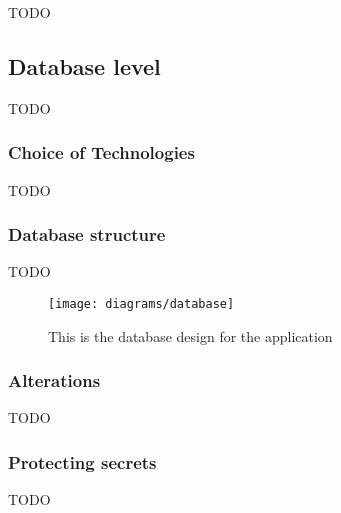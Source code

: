 {TODO}

\subsection{Database level}

{TODO}

\subsubsection*{Choice of Technologies}
\label{sec:database_choice_of_tech}

{TODO}

\subsubsection*{Database structure}

{TODO}

\begin{figure}[H]
    \centering
    \texttt{[image: diagrams/database]}
    \caption{This is the database design for the application}
    \label{fig:diagram_database_image}
\end{figure} 
\noindent

\subsubsection*{Alterations}

{TODO}

\subsubsection*{Protecting secrets}

{TODO}